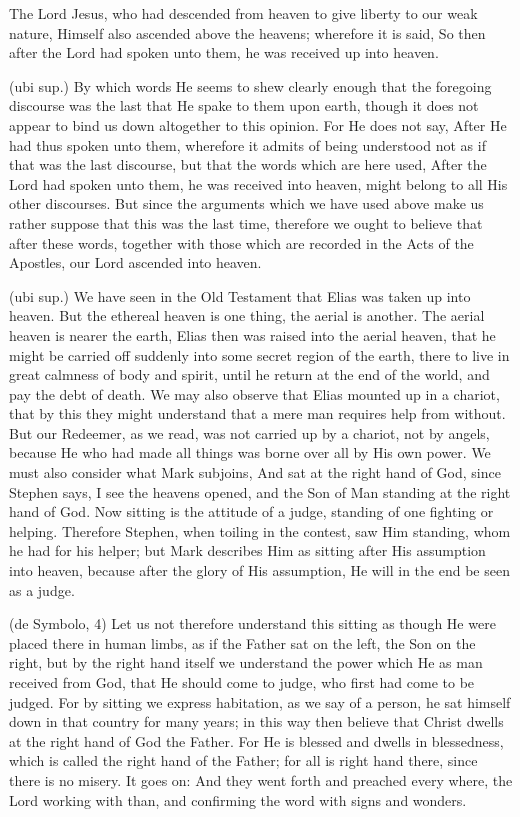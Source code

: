  The Lord Jesus, who had descended from heaven to give liberty to our weak nature, Himself also ascended above the heavens; wherefore it is said, So then after the Lord had spoken unto them, he was received up into heaven.

 (ubi sup.) By which words He seems to shew clearly enough that the foregoing discourse was the last that He spake to them upon earth, though it does not appear to bind us down altogether to this opinion. For He does not say, After He had thus spoken unto them, wherefore it admits of being understood not as if that was the last discourse, but that the words which are here used, After the Lord had spoken unto them, he was received into heaven, might belong to all His other discourses. But since the arguments which we have used above make us rather suppose that this was the last time, therefore we ought to believe that after these words, together with those which are recorded in the Acts of the Apostles, our Lord ascended into heaven.

 (ubi sup.) We have seen in the Old Testament that Elias was taken up into heaven. But the ethereal heaven is one thing, the aerial is another. The aerial heaven is nearer the earth, Elias then was raised into the aerial heaven, that he might be carried off suddenly into some secret region of the earth, there to live in great calmness of body and spirit, until he return at the end of the world, and pay the debt of death. We may also observe that Elias mounted up in a chariot, that by this they might understand that a mere man requires help from without. But our Redeemer, as we read, was not carried up by a chariot, not by angels, because He who had made all things was borne over all by His own power. We must also consider what Mark subjoins, And sat at the right hand of God, since Stephen says, I see the heavens opened, and the Son of Man standing at the right hand of God. Now sitting is the attitude of a judge, standing of one fighting or helping. Therefore Stephen, when toiling in the contest, saw Him standing, whom he had for his helper; but Mark describes Him as sitting after His assumption into heaven, because after the glory of His assumption, He will in the end be seen as a judge.

 (de Symbolo, 4) Let us not therefore understand this sitting as though He were placed there in human limbs, as if the Father sat on the left, the Son on the right, but by the right hand itself we understand the power which He as man received from God, that He should come to judge, who first had come to be judged. For by sitting we express habitation, as we say of a person, he sat himself down in that country for many years; in this way then believe that Christ dwells at the right hand of God the Father. For He is blessed and dwells in blessedness, which is called the right hand of the Father; for all is right hand there, since there is no misery. It goes on: And they went forth and preached every where, the Lord working with than, and confirming the word with signs and wonders.

